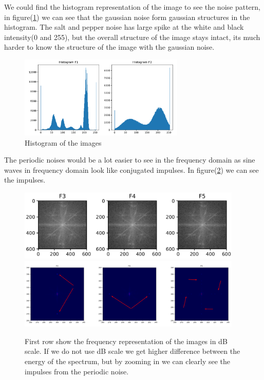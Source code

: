 {We could find the histogram representation of the image to see the noise pattern, in figure(\ref{histogramnoise}) we can see that the gaussian noise form gaussian structures in the histogram. The salt and pepper noise has large spike at the white and black intensity(0 and 255), but the overall structure of the image stays intact, its much harder to know the structure of the image with the gaussian noise.
\begin{figure}[!htb]
    {\centering
        \includegraphics[width=0.70\textwidth]{noisehist.pdf}
        \caption{Histogram of the images}
        \label{histogramnoise}
    \par}
    \end{figure}

The periodic noises would be a lot easier to see in the frequency domain as sine waves in frequency domain look like conjugated impulses. In figure(\ref{fourierrep}) we can see the impulses.

    \begin{figure}[!htb]
        {\centering
            \includegraphics[width=0.95\textwidth]{fourierrep.png}
            \includegraphics[width=0.95\textwidth]{filterrep2.png}
            \caption{First row show the frequency representation of the images in dB scale. If we do not use dB scale we get higher difference between the energy of the spectrum, but by zooming in we can clearly see the impulses from the periodic noise.}
            \label{fourierrep}
        \par}
        \end{figure}


}
